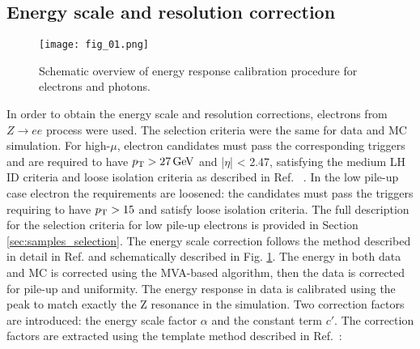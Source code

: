     \subsection{Energy scale and resolution correction}
        \begin{figure}[H]
    	\centering
    	\texttt{[image: fig\_01.png]}
    	\caption{Schematic overview of energy response calibration procedure for electrons and photons.}
    	\label{fig:calibrationChain}
    \end{figure}
    In order to obtain the energy scale and resolution corrections, electrons from $Z\rightarrow ee$ process were used. The selection criteria were the same for data and MC simulation. For high-$\mu$, electron candidates must pass the corresponding triggers and are required to have $p_{\text{T}} > 27\,\text{Ge\kern -0.1em V}$ and |$\eta$| < 2.47, satisfying the medium LH ID criteria and loose isolation criteria as described in Ref. ~\cite{Aaboud:2018ugz}. In the low pile-up case electron the requirements are loosened: the candidates must pass the triggers requiring to have $p_{\text{T}} > 15$ and satisfy loose isolation criteria. The full description for the selection criteria for low pile-up electrons is provided in Section \ref{sec:samples_selection}.
    The energy scale correction follows the method described in detail in Ref. \cite{egamma_perf_2017} and schematically described in Fig. \ref{fig:calibrationChain}. The energy in both data and MC is corrected using the MVA-based algorithm, then the data is corrected for pile-up and uniformity. The energy response in data is calibrated using the \Zee peak to match exactly the Z resonance in the simulation. Two correction factors are introduced: the energy scale factor $\alpha$ and the constant term $c'$. The correction factors are extracted using the template method described in Ref.~\cite{PERF-2013-05}:
